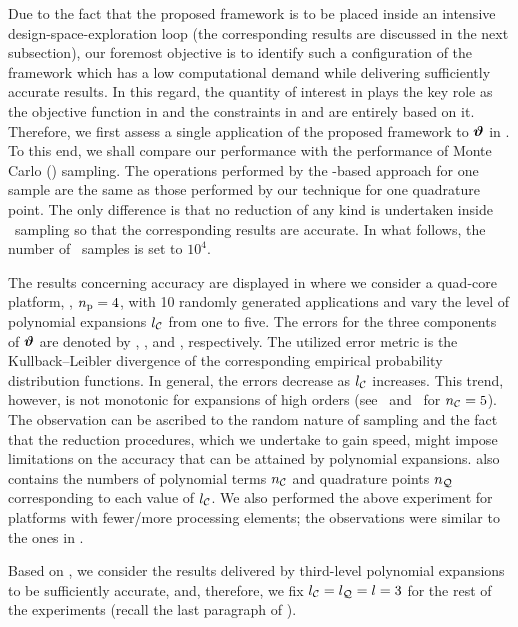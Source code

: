 Due to the fact that the proposed framework is to be placed inside an intensive design-space-exploration loop (the corresponding results are discussed in the next subsection), our foremost objective is to identify such a configuration of the framework which has a low computational demand while delivering sufficiently accurate results.
In this regard, the quantity of interest in  plays the key role as the objective function in  and the constraints in  and  are entirely based on it.
Therefore, we first assess a single application of the proposed framework to $\bm{\vartheta}$ in .
To this end, we shall compare our performance with the performance of Monte Carlo (\MC) sampling.
The operations performed by the \MC-based approach for one sample are the same as those performed by our technique for one quadrature point.
The only difference is that no reduction of any kind is undertaken inside \MC\ sampling so that the corresponding results are accurate.
In what follows, the number of \MC\ samples is set to $10^4$.


The results concerning accuracy are displayed in  where we consider a quad-core platform, \ie, ${n_\text{p}} = 4$, with 10 randomly generated applications and vary the level of polynomial expansions ${l_\mathcal{C}}$ from one to five.
The errors for the three components of $\bm{\vartheta}$ are denoted by \errorE, \errorQ, and \errorT, respectively.
The utilized error metric is the Kullback--Leibler divergence of the corresponding empirical probability distribution functions.
In general, the errors decrease as ${l_\mathcal{C}}$ increases.
This trend, however, is not monotonic for expansions of high orders (see \errorQ\ and \errorT\ for ${n_\mathcal{C}} = 5$).
The observation can be ascribed to the random nature of sampling and the fact that the reduction procedures, which we undertake to gain speed, might impose limitations on the accuracy that can be attained by polynomial expansions.
 also contains the numbers of polynomial terms ${n_\mathcal{C}}$ and quadrature points ${n_\mathcal{Q}}$ corresponding to each value of ${l_\mathcal{C}}$.
We also performed the above experiment for platforms with fewer/more processing elements; the observations were similar to the ones in .

Based on , we consider the results delivered by third-level polynomial expansions to be sufficiently accurate, and, therefore, we fix ${l_\mathcal{C}} = {l_\mathcal{Q}} = l = 3$ for the rest of the experiments (recall the last paragraph of ).

